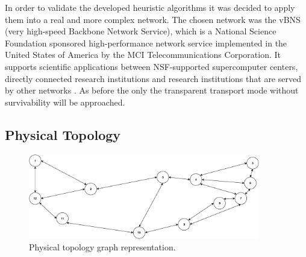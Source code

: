 In order to validate the developed heuristic algorithms it was decided to apply them into a real and more complex network. The chosen network was the vBNS (very high-speed Backbone Network Service), which is a National Science Foundation sponsored high-performance network service implemented in the United States of America by the MCI Telecommunications Corporation. It supports scientific applications between NSF-supported supercomputer centers, directly connected research institutions and research institutions that are served by other networks \cite{568211}. As before the only the transparent transport mode without survivability will be approached.

\subsection{Physical Topology}


\begin{figure}[H]
  \begin{center}
    \includegraphics[width=0.9\textwidth]{fig/logos/vBNS.pdf}
    \caption{Physical topology graph representation.}
  \end{center}
  \label{rptg}
\end{figure}

